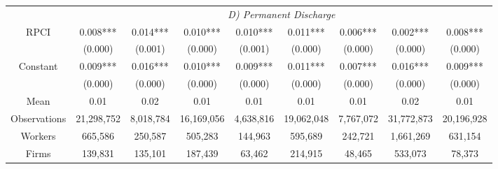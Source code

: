 \begin{tabular}{ccccccccc}
\cmidrule{2-9}      & \multicolumn{8}{c}{\textit{D) Permanent Discharge}} \\
RPCI  & 0.008*** & 0.014*** & 0.010*** & 0.010*** & 0.011*** & 0.006*** & 0.002*** & 0.008*** \\
      & (0.000) & (0.001) & (0.000) & (0.001) & (0.000) & (0.000) & (0.000) & (0.000) \\
Constant & 0.009*** & 0.016*** & 0.010*** & 0.009*** & 0.011*** & 0.007*** & 0.016*** & 0.009*** \\
      & (0.000) & (0.000) & (0.000) & (0.000) & (0.000) & (0.000) & (0.000) & (0.000) \\
Mean  & 0.01  & 0.02  & 0.01  & 0.01  & 0.01  & 0.01  & 0.02  & 0.01 \\
\midrule
Observations & 21,298,752 & 8,018,784 & 16,169,056 & 4,638,816 & 19,062,048 & 7,767,072 & 31,772,873 & 20,196,928 \\
Workers & 665,586 & 250,587 & 505,283 & 144,963 & 595,689 & 242,721 & 1,661,269 & 631,154 \\
Firms & 139,831 & 135,101 & 187,439 & 63,462 & 214,915 & 48,465 & 533,073 & 78,373 \\
\bottomrule
\bottomrule
\end{tabular}%
